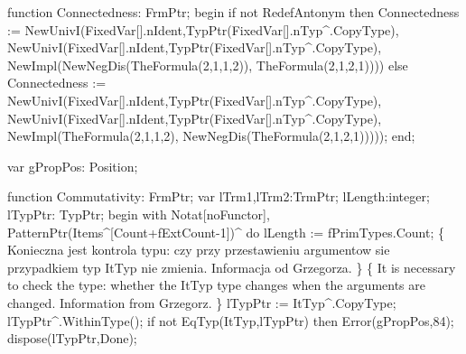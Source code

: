    function Connectedness: FrmPtr;
   begin
      if not RedefAntonym then Connectedness := 
         NewUnivI(FixedVar[].nIdent,TypPtr(FixedVar[].nTyp^.CopyType),
                  NewUnivI(FixedVar[].nIdent,TypPtr(FixedVar[].nTyp^.CopyType),
                           NewImpl(NewNegDis(TheFormula(2,1,1,2)),
                                   TheFormula(2,1,2,1))))
      else Connectedness := 
         NewUnivI(FixedVar[].nIdent,TypPtr(FixedVar[].nTyp^.CopyType),
                  NewUnivI(FixedVar[].nIdent,TypPtr(FixedVar[].nTyp^.CopyType),
                           NewImpl(TheFormula(2,1,1,2),
                                   NewNegDis(TheFormula(2,1,2,1)))));
   end;
   
var
   gPropPos: Position;
   
   function Commutativity: FrmPtr;
   var lTrm1,lTrm2:TrmPtr; lLength:integer;
   lTypPtr: TypPtr;
   begin
      with Notat[noFunctor], PatternPtr(Items^[Count+fExtCount-1])^ do
                                lLength := fPrimTypes.Count;
      \{ Konieczna jest kontrola typu: czy przy przestawieniu argumentow
        sie przypadkiem typ ItTyp nie zmienia.
        Informacja od Grzegorza.
      \}
      \{ It is necessary to check the type: whether the ItTyp type changes
        when the arguments are changed. Information from Grzegorz. \}
      lTypPtr := ItTyp^.CopyType;
      lTypPtr^.WithinType();
      if not EqTyp(ItTyp,lTypPtr) then Error(gPropPos,84);
      dispose(lTypPtr,Done);
      
